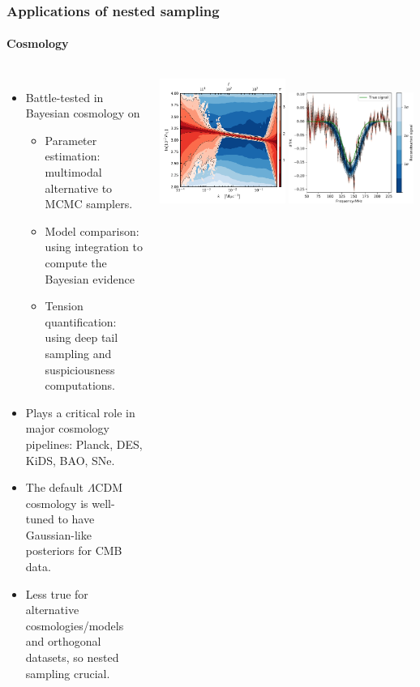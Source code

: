 \documentclass[aspectratio=169]{beamer}
\begin{document}
    \begin{frame}
        \frametitle{Applications of nested sampling}
        \framesubtitle{Cosmology}
        \begin{columns}
            \begin{itemize}
                \item Battle-tested in Bayesian cosmology on
                    \begin{itemize}
                        \item Parameter estimation: multimodal alternative to MCMC samplers.
                        \item Model comparison: using integration to compute the Bayesian evidence
                        \item Tension quantification: using deep tail sampling and suspiciousness computations.
                    \end{itemize}
                \item Plays a critical role in major cosmology pipelines: Planck, DES, KiDS, BAO, SNe.
                \item The default $\Lambda$CDM cosmology is well-tuned to have Gaussian-like posteriors for CMB data. 
                \item Less true for alternative cosmologies/models and orthogonal datasets, so nested sampling crucial.
            \end{itemize}
            \includegraphics[width=0.49\textwidth]{figures/pps_both}
            \includegraphics[width=0.49\textwidth]{figures/reach_fit-cropped.pdf}

\end{columns}
\end{frame}
\end{document}
